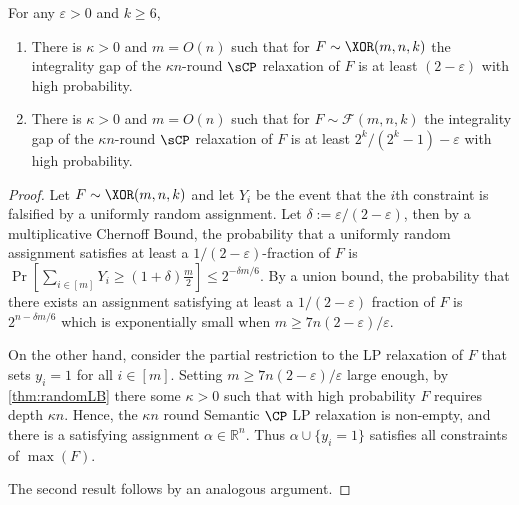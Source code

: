 \documentclass{toc}
\begin{document}
\begin{theorem}
	For any $\varepsilon >0$ and $k \geq 6$,
	\begin{enumerate}
		\item[$1$.] There is $\kappa>0$ and $m = O(n)$ such that for $F \sim \XOR(m,n,k)$ the integrality gap of the $\kappa n$-round  $\sCP$ relaxation of $F$ is at least $(2-\varepsilon)$ with high probability. 
		\item[$2$.] There is $\kappa >0$ and $m=O(n)$ such that for $F \sim \mathcal{F}(m,n,k)$ the integrality gap of the $\kappa n$-round $\sCP$ relaxation of $F$ is at least $2^k/(2^k-1) - \varepsilon$ with high probability.
	\end{enumerate}
\end{theorem}
\begin{proof}
	Let $F \sim \XOR(m,n,k)$ and let $Y_i$ be the event that the $i$th constraint is falsified by a uniformly random assignment. Let $\delta:=\varepsilon/(2-\varepsilon)$, then by a multiplicative Chernoff Bound, the probability that a uniformly random assignment satisfies at least a $1/(2-\varepsilon)$-fraction of $F$ is 
	$ \Pr [\sum_{i \in [m]}Y_i \geq (1+\delta)\frac{m}{2} ] \leq 2^{-\delta m/6}$.
	By a union bound, the probability that there exists an assignment satisfying at least a $1/(2-\varepsilon)$ fraction of $F$ is $2^{n-\delta m/6}$ which is exponentially small when $m \geq 7n(2-\varepsilon)/\varepsilon$.
	
	On the other hand, consider the partial restriction to the LP relaxation of $F$ that sets $y_i=1$ for all $i \in [m]$.
	Setting $m \geq 7n(2-\varepsilon)/\varepsilon$ large enough, by \autoref{thm:randomLB} there some $\kappa > 0$ such that with high probability $F$ requires depth $\kappa n$. 
	Hence, the $\kappa n$ round Semantic $\CP$ LP relaxation is non-empty, and there is a satisfying assignment $\alpha \in \mathbb{R}^n$. Thus $\alpha \cup \{y_i=1\}$ satisfies all constraints of $\max(F)$.
	
	The second result follows by an analogous argument.
\end{proof}




%


%
\end{document}
